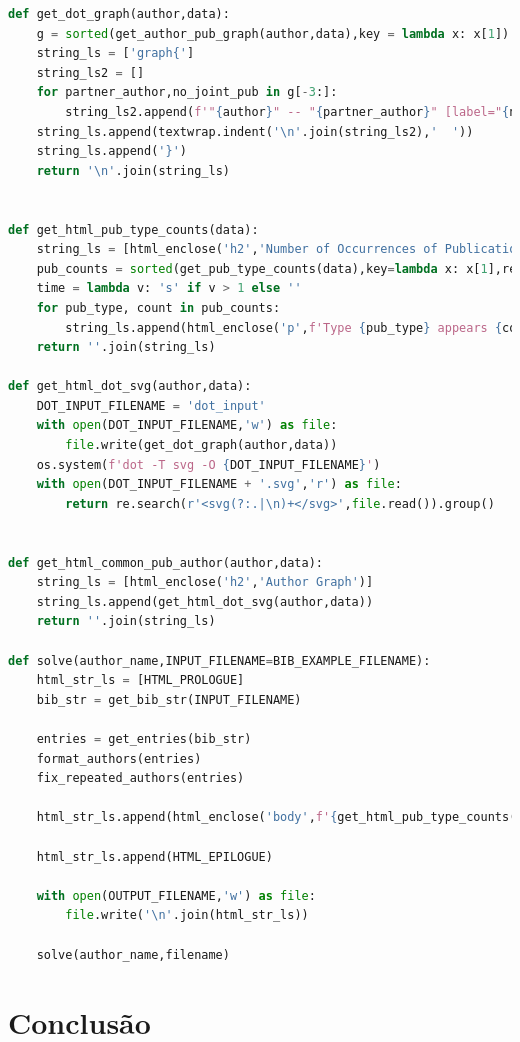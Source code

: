 \documentclass[11pt,a4paper]{report}
\begin{document}
\begin{lstlisting}[language=python]
def get_dot_graph(author,data):
    g = sorted(get_author_pub_graph(author,data),key = lambda x: x[1])
    string_ls = ['graph{']
    string_ls2 = []
    for partner_author,no_joint_pub in g[-3:]:
        string_ls2.append(f'"{author}" -- "{partner_author}" [label="{no_joint_pub}"]')
    string_ls.append(textwrap.indent('\n'.join(string_ls2),'  '))
    string_ls.append('}')
    return '\n'.join(string_ls)


def get_html_pub_type_counts(data):
    string_ls = [html_enclose('h2','Number of Occurrences of Publication Types')]
    pub_counts = sorted(get_pub_type_counts(data),key=lambda x: x[1],reverse=True)
    time = lambda v: 's' if v > 1 else ''
    for pub_type, count in pub_counts:
        string_ls.append(html_enclose('p',f'Type {pub_type} appears {count} time{time(count)}'))
    return ''.join(string_ls)

def get_html_dot_svg(author,data):
    DOT_INPUT_FILENAME = 'dot_input'
    with open(DOT_INPUT_FILENAME,'w') as file:
        file.write(get_dot_graph(author,data))
    os.system(f'dot -T svg -O {DOT_INPUT_FILENAME}')
    with open(DOT_INPUT_FILENAME + '.svg','r') as file:
        return re.search(r'<svg(?:.|\n)+</svg>',file.read()).group()


def get_html_common_pub_author(author,data):
    string_ls = [html_enclose('h2','Author Graph')]
    string_ls.append(get_html_dot_svg(author,data))
    return ''.join(string_ls)

def solve(author_name,INPUT_FILENAME=BIB_EXAMPLE_FILENAME):
    html_str_ls = [HTML_PROLOGUE]
    bib_str = get_bib_str(INPUT_FILENAME)

    entries = get_entries(bib_str)
    format_authors(entries)
    fix_repeated_authors(entries)

    html_str_ls.append(html_enclose('body',f'{get_html_pub_type_counts(entries)}{get_html_common_pub_author(author_name,entries)}{get_html_pub_type_index(entries)}{get_html_author_index(entries)}'))

    html_str_ls.append(HTML_EPILOGUE)

    with open(OUTPUT_FILENAME,'w') as file:
        file.write('\n'.join(html_str_ls))

    solve(author_name,filename)

\end{lstlisting}

\chapter{Conclusão}
\end{document}
